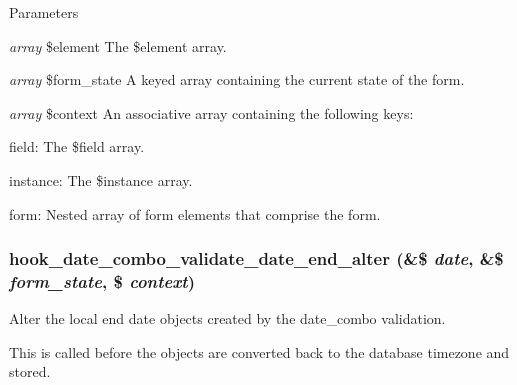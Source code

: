 \begin{DoxyParams}{Parameters}
\item[{\em array}]\$element The \$element array. \item[{\em array}]\$form\_\-state A keyed array containing the current state of the form. \item[{\em array}]\$context An associative array containing the following keys:
\begin{DoxyItemize}
\item field: The \$field array.
\item instance: The \$instance array.
\item form: Nested array of form elements that comprise the form. 
\end{DoxyItemize}\end{DoxyParams}
\hypertarget{date_8api_8php_ae400f94244ac446f9682e71a57b14f9b}{
\subsubsection[{hook\_\-date\_\-combo\_\-validate\_\-date\_\-end\_\-alter}]{\setlength{\rightskip}{0pt plus 5cm}hook\_\-date\_\-combo\_\-validate\_\-date\_\-end\_\-alter (\&\$ {\em date}, \/  \&\$ {\em form\_\-state}, \/  \$ {\em context})}}
\label{date_8api_8php_ae400f94244ac446f9682e71a57b14f9b}
Alter the local end date objects created by the date\_\-combo validation.

This is called before the objects are converted back to the database timezone and stored.


